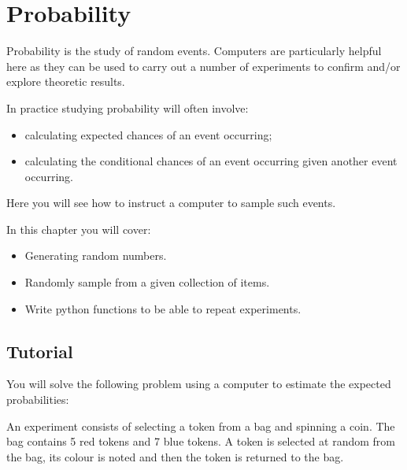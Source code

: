 \chapter{Probability}
\label{chp:probability}

Probability is the study of random events. Computers are particularly helpful
here as they can be used to carry out a number of experiments to confirm and/or
explore theoretic results.


In practice studying probability will often involve:
\begin{itemize}
\item 

calculating expected chances of an event occurring;

\item 

calculating the conditional chances of an event occurring given another event
occurring.

\end{itemize}


Here you will see how to instruct a computer to sample such events.



\begin{note}
In this chapter you will cover:
\begin{itemize}
\item 

Generating random numbers.

\item 

Randomly sample from a given collection of items.

\item 

Write python functions to be able to repeat experiments.

\end{itemize}
\end{note}




\section{Tutorial}
\label{\detokenize{tools-for-mathematics/06-probability/tutorial/main:tutorial}}\label{\detokenize{tools-for-mathematics/06-probability/tutorial/main::doc}}

You will solve the following problem using a computer to estimate the expected
probabilities:

An experiment consists of selecting a token from a bag and spinning a coin. The
bag contains 5 red tokens and 7 blue tokens. A token is selected at random from
the bag, its colour is noted and then the token is returned to the bag.


